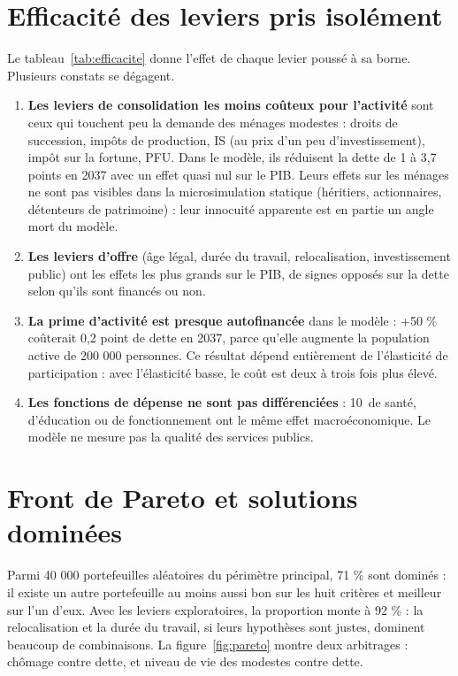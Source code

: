 \section{Efficacité des leviers pris isolément}

Le tableau~\ref{tab:efficacite} donne l'effet de chaque levier poussé à sa borne. Plusieurs constats se dégagent.
\begin{enumerate}
\item \textbf{Les leviers de consolidation les moins coûteux pour l'activité} sont ceux qui touchent peu la demande
des ménages modestes : droits de succession, impôts de production, IS (au prix d'un peu d'investissement), impôt
sur la fortune, PFU. Dans le modèle, ils réduisent la dette de 1 à 3,7 points en 2037 avec un effet quasi nul sur le
PIB. Leurs effets sur les ménages ne sont pas visibles dans la microsimulation statique (héritiers, actionnaires,
détenteurs de patrimoine) : leur innocuité apparente est en partie un angle mort du modèle.
\item \textbf{Les leviers d'offre} (âge légal, durée du travail, relocalisation, investissement public) ont les effets
les plus grands sur le PIB, de signes opposés sur la dette selon qu'ils sont financés ou non.
\item \textbf{La prime d'activité est presque autofinancée} dans le modèle : +50 \% coûterait 0,2 point de dette en
2037, parce qu'elle augmente la population active de 200 000 personnes. Ce résultat dépend entièrement de
l'élasticité de participation : avec l'élasticité basse, le coût est deux à trois fois plus élevé.
\item \textbf{Les fonctions de dépense ne sont pas différenciées} : 10\md\ de santé, d'éducation ou de fonctionnement
ont le même effet macroéconomique. Le modèle ne mesure pas la qualité des services publics.
\end{enumerate}



\section{Front de Pareto et solutions dominées}

Parmi 40 000 portefeuilles aléatoires du périmètre principal, 71 \% sont dominés : il existe un autre portefeuille au
moins aussi bon sur les huit critères et meilleur sur l'un d'eux. Avec les leviers exploratoires, la proportion monte
à 92 \% : la relocalisation et la durée du travail, si leurs hypothèses sont justes, dominent beaucoup de
combinaisons. La figure~\ref{fig:pareto} montre deux arbitrages : chômage contre dette, et niveau de vie des
modestes contre dette.

